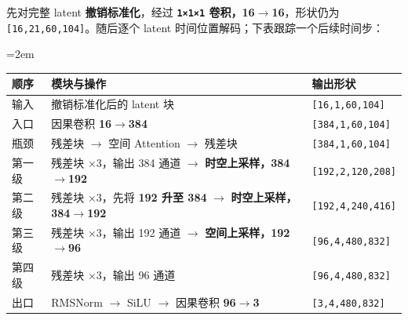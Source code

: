 \documentclass[
  11pt,
  a4paper,
  fontset=none]{ctexart}
\newcounter{none} %
\newcommand{\NotesTableStyle}{\linespread{1}\fontsize{9.5pt}{13pt}\selectfont\setlength{\tabcolsep}{4pt}\renewcommand{\arraystretch}{1.1}\setlength{\extrarowheight}{5pt}\setlength{\LTpre}{5pt}\setlength{\LTpost}{6pt}\setlength{\parskip}{0pt}\emergencystretch=2em}
\begin{document}
先对完整 latent \textbf{撤销标准化}，经过 \textbf{\texttt{1×1×1}
卷积，16\(\rightarrow\)16}，形状仍为
\texttt{{[}16,21,60,104{]}}。随后逐个 latent
时间位置解码；下表跟踪一个后续时间步：

\begingroup\NotesTableStyle\fontsize{10.5pt}{14pt}\selectfont\renewcommand{\arraystretch}{1.08}\setlength{\extrarowheight}{3pt}

{\def\LTcaptype{none} %
\begin{longtable}[]{@{}
  >{\raggedright\arraybackslash}p{}
  >{\raggedright\arraybackslash}p{}
  >{\raggedright\arraybackslash}p{}@{}}
\toprule\noalign{}
\begin{minipage}[b]{\linewidth}\raggedright
顺序
\end{minipage} & \begin{minipage}[b]{\linewidth}\raggedright
模块与操作
\end{minipage} & \begin{minipage}[b]{\linewidth}\raggedright
输出形状
\end{minipage} \\
\midrule\noalign{}
\endhead
\bottomrule\noalign{}
\endlastfoot
输入 & 撤销标准化后的 latent 块 & \texttt{{[}16,1,60,104{]}} \\
入口 & 因果卷积 \textbf{16\(\rightarrow\)384} &
\texttt{{[}384,1,60,104{]}} \\
瓶颈 & 残差块 \(\rightarrow\) 空间 Attention \(\rightarrow\) 残差块 &
\texttt{{[}384,1,60,104{]}} \\
第一级 & 残差块 ×3，输出 384 通道 \(\rightarrow\)
\textbf{时空上采样，384\(\rightarrow\)192} &
\texttt{{[}192,2,120,208{]}} \\
第二级 & 残差块 ×3，先将 \textbf{192 升至 384} \(\rightarrow\)
\textbf{时空上采样，384\(\rightarrow\)192} &
\texttt{{[}192,4,240,416{]}} \\
第三级 & 残差块 ×3，输出 192 通道 \(\rightarrow\)
\textbf{空间上采样，192\(\rightarrow\)96} &
\texttt{{[}96,4,480,832{]}} \\
第四级 & 残差块 ×3，输出 96 通道 & \texttt{{[}96,4,480,832{]}} \\
出口 & RMSNorm \(\rightarrow\) SiLU \(\rightarrow\) 因果卷积
\textbf{96\(\rightarrow\)3} & \texttt{{[}3,4,480,832{]}} \\
\end{longtable}
}

\endgroup
\end{document}
